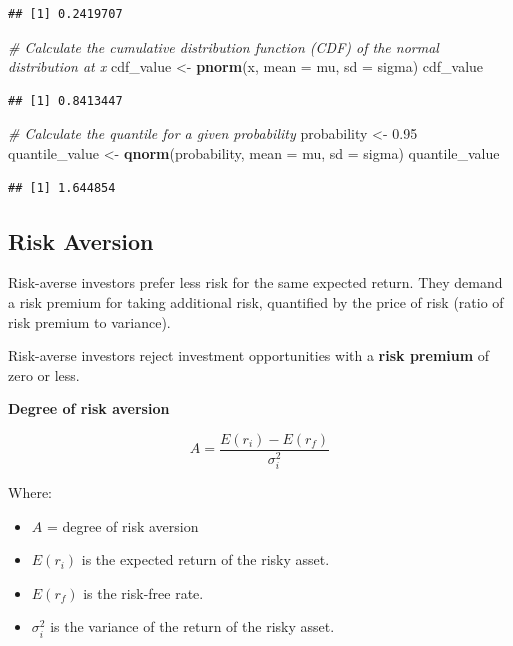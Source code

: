 \documentclass[
]{book}
\newenvironment{Shaded}{\begin{snugshade}}{\end{snugshade}}
\newcommand{\AttributeTok}[1]{\textcolor[rgb]{0.13,0.29,0.53}{#1}}
\newcommand{\CommentTok}[1]{\textcolor[rgb]{0.56,0.35,0.01}{\textit{#1}}}
\newcommand{\FloatTok}[1]{\textcolor[rgb]{0.00,0.00,0.81}{#1}}
\newcommand{\FunctionTok}[1]{\textcolor[rgb]{0.13,0.29,0.53}{\textbf{#1}}}
\newcommand{\NormalTok}[1]{#1}
\newcommand{\OtherTok}[1]{\textcolor[rgb]{0.56,0.35,0.01}{#1}}
\providecommand{\tightlist}{%
  \setlength{\itemsep}{0pt}\setlength{\parskip}{0pt}}
\begin{document}
\begin{verbatim}
## [1] 0.2419707
\end{verbatim}

\begin{Shaded}
\begin{Highlighting}[]
\CommentTok{\# Calculate the cumulative distribution function (CDF) of the normal distribution at x}
\NormalTok{cdf\_value }\OtherTok{\textless{}{-}} \FunctionTok{pnorm}\NormalTok{(x, }\AttributeTok{mean =}\NormalTok{ mu, }\AttributeTok{sd =}\NormalTok{ sigma)}
\NormalTok{cdf\_value}
\end{Highlighting}
\end{Shaded}

\begin{verbatim}
## [1] 0.8413447
\end{verbatim}

\begin{Shaded}
\begin{Highlighting}[]
\CommentTok{\# Calculate the quantile for a given probability}
\NormalTok{probability }\OtherTok{\textless{}{-}} \FloatTok{0.95}
\NormalTok{quantile\_value }\OtherTok{\textless{}{-}} \FunctionTok{qnorm}\NormalTok{(probability, }\AttributeTok{mean =}\NormalTok{ mu, }\AttributeTok{sd =}\NormalTok{ sigma)}
\NormalTok{quantile\_value}
\end{Highlighting}
\end{Shaded}

\begin{verbatim}
## [1] 1.644854
\end{verbatim}

\hypertarget{risk-aversion}{%
\subsection{Risk Aversion}\label{risk-aversion}}

Risk-averse investors prefer less risk for the same expected return.
They demand a risk premium for taking additional risk, quantified by the
price of risk (ratio of risk premium to variance).

Risk-averse investors reject investment opportunities with a
\textbf{risk premium} of zero or less.

\textbf{Degree of risk aversion}

\[
A = \frac{E(r_i) - E(r_f)}{\sigma_i^2}
\]

Where:

\begin{itemize}
\tightlist
\item
  \(A\) = degree of risk aversion
\item
  \(E(r_i)\) is the expected return of the risky asset.
\item
  \(E(r_f)\) is the risk-free rate.
\item
  \(\sigma_i^2\) is the variance of the return of the risky asset.
\end{itemize}
\end{document}
